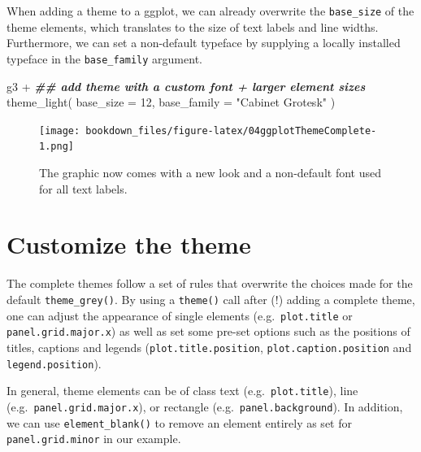 \documentclass[
]{krantz}
\makeatletter
\newenvironment{Shaded}{\begin{snugshade}}{\end{snugshade}}
\newcommand{\AttributeTok}[1]{\textcolor[rgb]{0.61,0.61,0.61}{#1}}
\newcommand{\DecValTok}[1]{\textcolor[rgb]{0.06,0.06,0.06}{#1}}
\newcommand{\DocumentationTok}[1]{\textcolor[rgb]{0.37,0.37,0.37}{\textbf{\textit{#1}}}}
\newcommand{\FunctionTok}[1]{\textcolor[rgb]{0,0,0}{#1}}
\newcommand{\NormalTok}[1]{#1}
\newcommand{\SpecialCharTok}[1]{\textcolor[rgb]{0,0,0}{#1}}
\newcommand{\StringTok}[1]{\textcolor[rgb]{0.5,0.5,0.5}{#1}}
\newenvironment{kframe}{%
\medskip{}
\setlength{\fboxsep}{.8em}
 \def\at@end@of@kframe{}%
 \ifinner\ifhmode%
  \def\at@end@of@kframe{\end{minipage}}%
  \begin{minipage}{\columnwidth}%
 \fi\fi%
 \def\FrameCommand##1{\hskip\@totalleftmargin \hskip-\fboxsep
 \colorbox{shadecolor}{##1}\hskip-\fboxsep
     \hskip-\linewidth \hskip-\@totalleftmargin \hskip\columnwidth}%
 \MakeFramed {\advance\hsize-\width
   \@totalleftmargin\z@ \linewidth\hsize
   \@setminipage}}%
 {\par\unskip\endMakeFramed%
 \at@end@of@kframe}
\renewenvironment{Shaded}{\begin{kframe}}{\end{kframe}}
\makeatother
\begin{document}
When adding a theme to a ggplot, we can already overwrite the \texttt{base\_size} of the theme elements, which translates to the size of text labels and line widths. Furthermore, we can set a non-default typeface by supplying a locally installed typeface in the \texttt{base\_family} argument.

\begin{Shaded}
\begin{Highlighting}[]
\NormalTok{g3 }\SpecialCharTok{+}
  \DocumentationTok{\#\# add theme with a custom font + larger element sizes}
  \FunctionTok{theme\_light}\NormalTok{(}
    \AttributeTok{base\_size =} \DecValTok{12}\NormalTok{, }\AttributeTok{base\_family =} \StringTok{"Cabinet Grotesk"}
\NormalTok{  )}
\end{Highlighting}
\end{Shaded}

\begin{figure}
\centering
\texttt{[image: bookdown\_files/figure-latex/04ggplotThemeComplete-1.png]}
\caption{\label{fig:04ggplotThemeComplete}The graphic now comes with a new look and a non-default font used for all text labels.}
\end{figure}

\hypertarget{custom-theming}{%
\section{Customize the theme}\label{custom-theming}}

The complete themes follow a set of rules that overwrite the choices made for the default \texttt{theme\_grey()}. By using a \texttt{theme()} call after (!) adding a complete theme, one can adjust the appearance of single elements (e.g.~\texttt{plot.title} or \texttt{panel.grid.major.x}) as well as set some pre-set options such as the positions of titles, captions and legends (\texttt{plot.title.position}, \texttt{plot.caption.position} and \texttt{legend.position}).

In general, theme elements can be of class text (e.g.~\texttt{plot.title}), line (e.g.~\texttt{panel.grid.major.x}), or rectangle (e.g.~\texttt{panel.background}). In addition, we can use \texttt{element\_blank()} to remove an element entirely as set for \texttt{panel.grid.minor} in our example.
\end{document}
